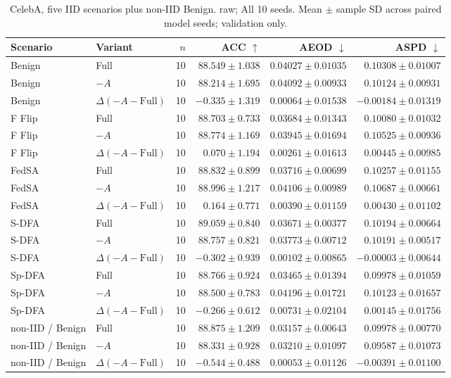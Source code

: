 \begin{table}[t]
\centering
\small
\caption{CelebA, five IID scenarios plus non-IID Benign. raw; All 10 seeds. Mean $\pm$ sample SD across paired model seeds; validation only.}
\begin{tabular}{llrrrr}
\toprule
Scenario & Variant & $n$ & ACC $\uparrow$ & AEOD $\downarrow$ & ASPD $\downarrow$ \\
\midrule
Benign & Full & 10 & $88.549 \pm 1.038$ & $0.04027 \pm 0.01035$ & $0.10308 \pm 0.01007$ \\
Benign & $-A$ & 10 & $88.214 \pm 1.695$ & $0.04092 \pm 0.00933$ & $0.10124 \pm 0.00931$ \\
Benign & $\Delta(-A-\mathrm{Full})$ & 10 & $-0.335 \pm 1.319$ & $0.00064 \pm 0.01538$ & $-0.00184 \pm 0.01319$ \\
F Flip & Full & 10 & $88.703 \pm 0.733$ & $0.03684 \pm 0.01343$ & $0.10080 \pm 0.01032$ \\
F Flip & $-A$ & 10 & $88.774 \pm 1.169$ & $0.03945 \pm 0.01694$ & $0.10525 \pm 0.00936$ \\
F Flip & $\Delta(-A-\mathrm{Full})$ & 10 & $0.070 \pm 1.194$ & $0.00261 \pm 0.01613$ & $0.00445 \pm 0.00985$ \\
FedSA & Full & 10 & $88.832 \pm 0.899$ & $0.03716 \pm 0.00699$ & $0.10257 \pm 0.01155$ \\
FedSA & $-A$ & 10 & $88.996 \pm 1.217$ & $0.04106 \pm 0.00989$ & $0.10687 \pm 0.00661$ \\
FedSA & $\Delta(-A-\mathrm{Full})$ & 10 & $0.164 \pm 0.771$ & $0.00390 \pm 0.01159$ & $0.00430 \pm 0.01102$ \\
S-DFA & Full & 10 & $89.059 \pm 0.840$ & $0.03671 \pm 0.00377$ & $0.10194 \pm 0.00664$ \\
S-DFA & $-A$ & 10 & $88.757 \pm 0.821$ & $0.03773 \pm 0.00712$ & $0.10191 \pm 0.00517$ \\
S-DFA & $\Delta(-A-\mathrm{Full})$ & 10 & $-0.302 \pm 0.939$ & $0.00102 \pm 0.00865$ & $-0.00003 \pm 0.00644$ \\
Sp-DFA & Full & 10 & $88.766 \pm 0.924$ & $0.03465 \pm 0.01394$ & $0.09978 \pm 0.01059$ \\
Sp-DFA & $-A$ & 10 & $88.500 \pm 0.783$ & $0.04196 \pm 0.01721$ & $0.10123 \pm 0.01657$ \\
Sp-DFA & $\Delta(-A-\mathrm{Full})$ & 10 & $-0.266 \pm 0.612$ & $0.00731 \pm 0.02104$ & $0.00145 \pm 0.01756$ \\
non-IID / Benign & Full & 10 & $88.875 \pm 1.209$ & $0.03157 \pm 0.00643$ & $0.09978 \pm 0.00770$ \\
non-IID / Benign & $-A$ & 10 & $88.331 \pm 0.928$ & $0.03210 \pm 0.01097$ & $0.09587 \pm 0.01073$ \\
non-IID / Benign & $\Delta(-A-\mathrm{Full})$ & 10 & $-0.544 \pm 0.488$ & $0.00053 \pm 0.01126$ & $-0.00391 \pm 0.01100$ \\
\bottomrule
\end{tabular}
\end{table}

